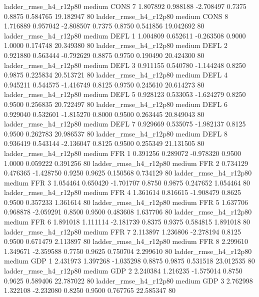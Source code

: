 ladder_rmse_h4_r12p80     medium     CONS                 7  1.807892 0.988188 -2.708497 0.7375 0.8875  0.584765   19.182947 80
 ladder_rmse_h4_r12p80     medium     CONS                 8  1.716889 0.957042 -2.808507 0.7375 0.8750  0.541856   19.042692 80
 ladder_rmse_h4_r12p80     medium     DEFL                 1  1.004809 0.652611 -0.263508 0.9000 1.0000  0.174748   20.349380 80
 ladder_rmse_h4_r12p80     medium     DEFL                 2  0.921880 0.563444 -0.792629 0.8875 0.9750  0.190490   20.424300 80
 ladder_rmse_h4_r12p80     medium     DEFL                 3  0.911155 0.540780 -1.144248 0.8250 0.9875  0.225834   20.513721 80
 ladder_rmse_h4_r12p80     medium     DEFL                 4  0.945211 0.544575 -1.416749 0.8125 0.9750  0.245610   20.614273 80
 ladder_rmse_h4_r12p80     medium     DEFL                 5  0.928123 0.533053 -1.624279 0.8250 0.9500  0.256835   20.722497 80
 ladder_rmse_h4_r12p80     medium     DEFL                 6  0.929040 0.532601 -1.815270 0.8000 0.9500  0.263445   20.849043 80
 ladder_rmse_h4_r12p80     medium     DEFL                 7  0.929669 0.535075 -1.982137 0.8125 0.9500  0.262783   20.986537 80
 ladder_rmse_h4_r12p80     medium     DEFL                 8  0.936419 0.543144 -2.136047 0.8125 0.9500  0.255349   21.131505 80
 ladder_rmse_h4_r12p80     medium      FFR                 1  0.391256 0.289072 -0.978320 0.9500 1.0000  0.059222    0.391256 80
 ladder_rmse_h4_r12p80     medium      FFR                 2  0.734129 0.476365 -1.428750 0.9250 0.9625  0.150568    0.734129 80
 ladder_rmse_h4_r12p80     medium      FFR                 3  1.054464 0.650420 -1.701707 0.8750 0.9875  0.247652    1.054464 80
 ladder_rmse_h4_r12p80     medium      FFR                 4  1.361614 0.816615 -1.908479 0.8625 0.9500  0.357233    1.361614 80
 ladder_rmse_h4_r12p80     medium      FFR                 5  1.637706 0.968878 -2.059291 0.8500 0.9500  0.483608    1.637706 80
 ladder_rmse_h4_r12p80     medium      FFR                 6  1.891018 1.111114 -2.181739 0.8375 0.9375  0.584815    1.891018 80
 ladder_rmse_h4_r12p80     medium      FFR                 7  2.113897 1.236806 -2.278194 0.8125 0.9500  0.671479    2.113897 80
 ladder_rmse_h4_r12p80     medium      FFR                 8  2.299610 1.349671 -2.359588 0.7750 0.9625  0.750704    2.299610 80
 ladder_rmse_h4_r12p80     medium      GDP                 1  2.431973 1.397268 -1.035298 0.8875 0.9875  0.531518   23.012535 80
 ladder_rmse_h4_r12p80     medium      GDP                 2  2.240384 1.216235 -1.575014 0.8750 0.9625  0.589406   22.787022 80
 ladder_rmse_h4_r12p80     medium      GDP                 3  2.762998 1.322108 -2.232080 0.8250 0.9500  0.767765   22.585347 80
